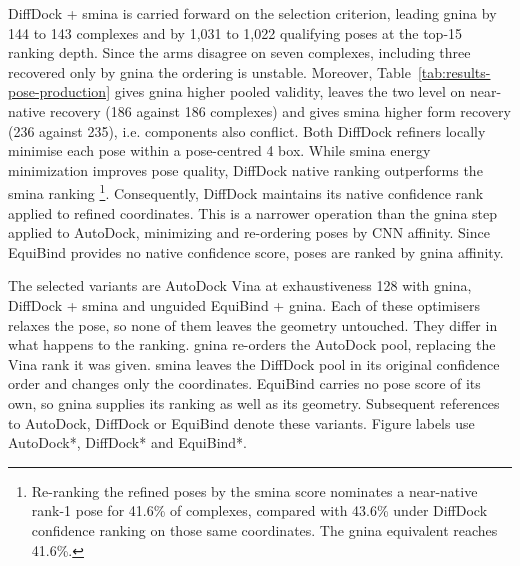 DiffDock + smina is carried forward on the selection criterion, leading gnina by 144 to 143 complexes and by 1,031 to 1,022 qualifying poses at the top-15 ranking depth. Since the arms disagree on seven complexes, including three recovered only by gnina the ordering is unstable. Moreover, Table~\ref{tab:results-pose-production} gives gnina higher pooled validity, leaves the two level on near-native recovery (186 against 186 complexes) and gives smina higher form recovery (236 against 235), i.e. components also conflict.  Both DiffDock refiners locally minimise each pose within a pose-centred 4\angstrom{} box. While smina energy minimization improves pose quality, DiffDock native ranking outperforms the smina ranking \footnote{Re-ranking the refined poses by the smina score nominates a near-native rank-1 pose for 41.6\% of complexes, compared with 43.6\% under DiffDock confidence ranking on those same coordinates. The gnina equivalent reaches 41.6\%.}. Consequently, DiffDock maintains its native confidence rank applied to refined coordinates. This is a narrower operation than the gnina step applied to AutoDock, minimizing and re-ordering poses by CNN affinity. Since EquiBind provides no native confidence score, poses are ranked by gnina affinity.

The selected variants are AutoDock Vina at exhaustiveness 128 with gnina, DiffDock + smina and unguided EquiBind + gnina. Each of these optimisers relaxes the pose, so none of them leaves the geometry untouched. They differ in what happens to the ranking. gnina re-orders the AutoDock pool, replacing the Vina rank it was given. smina leaves the DiffDock pool in its original confidence order and changes only the coordinates. EquiBind carries no pose score of its own, so gnina supplies its ranking as well as its geometry. Subsequent references to AutoDock, DiffDock or EquiBind denote these variants. Figure labels use AutoDock*, DiffDock* and EquiBind*.

